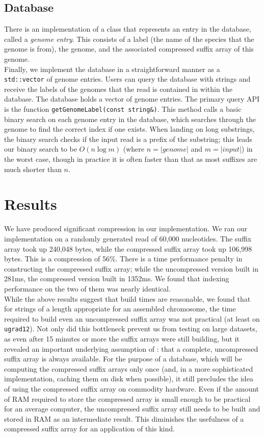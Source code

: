 \documentclass{article}
\begin{document}
\subsection{Database}
\label{subsec-db}
\indent There is an implementation of a class that represents an entry in the database, called a \emph{genome entry}. This consists of a label (the name of the species that the genome is from), the genome, and the associated compressed suffix array of this genome.\\
\indent Finally, we implement the database in a straightforward manner as a \texttt{std::vector} of genome entries. Users can query the database with strings and receive the labels of the genomes that the read is contained in within the database. The database holds a vector of genome entries. The primary query API is the function \texttt{getGenomeLabel(const string\&)}. This method calls a basic binary search on each genome entry in the database, which searches through the genome to find the correct index if one exists. When landing on long substrings, the binary search checks if the input read is a prefix of the substring; this leads our binary search to be $O(n \log m)$ (where $n = |genome|$ and $m = |input|$) in the worst case, though in practice it is often faster than that as most suffixes are much shorter than $n$.\\

\section{Results}
\label{sec-results}
We have produced significant compression in our implementation. We ran our implementation on a randomly generated read of 60,000 nucleotides. The suffix array took up 240,048 bytes, while the compressed suffix array took up 106,998 bytes. This is a compression of 56\%. There is a time performance penalty in constructing the compressed suffix array; while the uncompressed version built in 281ms, the compressed version built in 1352ms. We found that indexing performance on the two of them was nearly identical.\\
\indent While the above results suggest that build times are reasonable, we found that for strings of a length appropriate for an assembled chromosome, the time required to build even an uncompressed suffix array was not practical (at least on \texttt{ugrad12}). Not only did this bottleneck prevent us from testing on large datasets, as even after 15 minutes or more the suffix arrays were still building, but it revealed an important underlying assumption of \cite{GV05}: that a complete, uncompressed suffix array is always available. For the purpose of a database, which will be computing the compressed suffix arrays only once (and, in a more sophisticated implementation, caching them on disk when possible), it still precludes the idea of using the compressed suffix array on commodity hardware. Even if the amount of RAM required to store the compressed array is small enough to be practical for an average computer, the uncompressed suffix array still needs to be built and stored in RAM as an intermediate result. This diminishes the usefulness of a compressed suffix array for an application of this kind.
\end{document}
